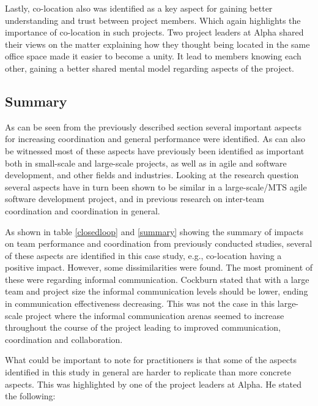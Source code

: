 Lastly, co-location also was identified as a key aspect for gaining better understanding and trust between project members. Which again highlights the importance of co-location in such projects. Two project leaders at Alpha shared their views on the matter explaining how they thought being located in the same office space made it easier to become a unity. It lead to members knowing each other, gaining a better shared mental model regarding aspects of the project.

\subsection{Summary}


As can be seen from the previously described section several important aspects for increasing coordination and general performance were identified. As can also be witnessed most of these aspects have previously been identified as important both in small-scale and large-scale projects, as well as in agile and software development, and other fields and industries. Looking at the research question several aspects have in turn been shown to be similar in a large-scale/MTS agile software development project, and in previous research on inter-team coordination and coordination in general.

As shown in table \ref{closedloop} and \ref{summary} showing the summary of impacts on team performance and coordination from previously conducted studies, several of these aspects are identified in this case study, e.g., co-location having a positive impact. However, some dissimilarities were found. The most prominent of these were regarding informal communication. Cockburn \cite{} stated that with a large team and project size the informal communication levels should be lower, ending in communication effectiveness decreasing. This was not the case in this large-scale project where the informal communication arenas seemed to increase throughout the course of the project leading to improved communication, coordination and collaboration.

What could be important to note for practitioners is that some of the aspects identified in this study in general are harder to replicate than more concrete aspects. This was highlighted by one of the project leaders at Alpha. He stated the following:


